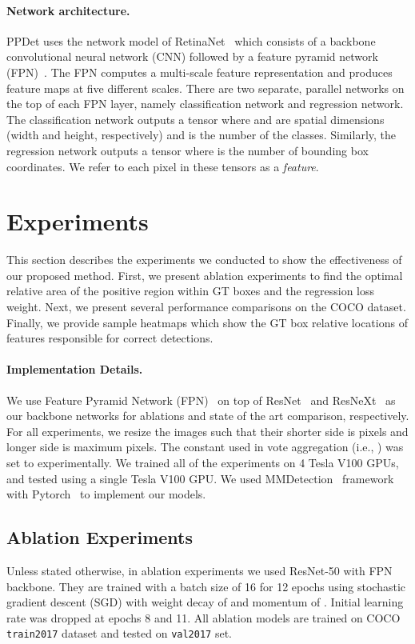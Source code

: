 \documentclass{bmvc2k}
\begin{document}
\paragraph{Network architecture.} PPDet uses the network model of RetinaNet~\cite{retinanet} which consists of a backbone convolutional neural network (CNN) followed by a feature pyramid network (FPN)~\cite{fpn}. The FPN computes a multi-scale feature representation and produces feature maps at five different scales. There are two separate, parallel networks on the top of each FPN layer, namely classification network and regression network. The classification network outputs a  tensor where  and  are spatial dimensions (width and height, respectively) and  is the number of the classes. Similarly, the regression network outputs a  tensor where  is the number of bounding box coordinates. We refer to each pixel in these tensors as a \emph{feature}. 


\section{Experiments}


This section describes the experiments we conducted to show the effectiveness of our proposed method. First, we present ablation  experiments to find the optimal relative area of the positive region  within GT boxes and the regression loss weight. Next, we present several performance comparisons on the COCO dataset. Finally, we provide sample heatmaps which show the GT box relative locations of features responsible for correct detections. 


\paragraph{Implementation Details.} We use Feature Pyramid Network (FPN)~\cite{fpn} on top of ResNet~\cite{resnet} and ResNeXt~\cite{resnext} as our backbone networks for ablations and state of the art comparison, respectively. For all experiments, we resize the images such that their shorter side is  pixels and longer side is maximum  pixels. The constant  used in vote aggregation (i.e., ) was set to  experimentally. We trained all of the experiments on 4 Tesla V100 GPUs, and tested using a single Tesla V100 GPU. We used MMDetection~\cite{mmdetection} framework with Pytorch~\cite{pytorch} to implement our models.




\subsection{Ablation Experiments}
Unless stated otherwise, in ablation experiments we used ResNet-50 with FPN backbone. They are trained with a batch size of 16 for 12 epochs using stochastic gradient descent (SGD) with weight decay of  and momentum of . Initial learning rate  was dropped  at epochs 8 and 11. All ablation models are trained on COCO~\cite{mscoco} \texttt{train2017} dataset and tested on \texttt{val2017} set.
\end{document}

